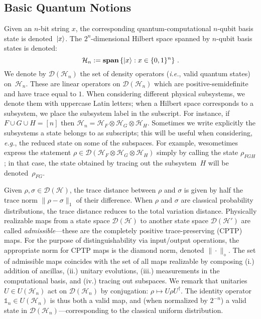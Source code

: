 \subsection{Basic Quantum Notions}
\label{sec:quantum-prelims}
Given an $n$-bit string $x$, the corresponding quantum-computational $n$-qubit basis state is denoted~${\lvert}x\rangle$. The $2^n$-dimensional Hilbert space spanned by $n$-qubit basis states is denoted:
\begin{equation}
\mathcal{H}_n := \textbf{span} \left\{ {\lvert}x\rangle : x \in \{0,1\}^{n} \right\}\,.
\end{equation}
We denote by $\mathcal{D}(\mathcal{H}_n)$ the set of density operators (\emph{i.e.}, valid quantum states) on~$\mathcal{H}_n$. These are linear operators on $\mathcal{D}(\mathcal{H}_n)$ which are positive-semidefinite and have trace equal to $1$. When considering different physical subsystems, we denote them with uppercase Latin letters; when a Hilbert space corresponds to a subsystem, we place the subsystem label in the subscript. For instance, if $F \cup G \cup H = [n]$ then $\mathcal{H}_n = \mathcal{H}_F \otimes \mathcal{H}_G \otimes \mathcal{H}_H.$ Sometimes we  write explicitly the subsystems a state belongs to as subscripts; this will be useful when considering, \emph{e.g.}, the reduced state on some of the subspaces. For example, wesometimes express the statement $\rho \in \mathcal{D}(\mathcal{H}_F \otimes \mathcal{H}_G \otimes \mathcal{H}_H)$ simply by calling the state $\rho_{FGH}$; in that case, the state obtained by tracing out the subsystem~$H$ will be denoted~$\rho_{FG}$.


Given $\rho, \sigma \in \mathcal{D}(\mathcal{H})$, the trace distance between $\rho$ and $\sigma$ is given by half the trace norm $\|\rho - \sigma\|_1$ of their difference. When $\rho$ and $\sigma$ are classical probability distributions, the trace distance reduces to the total variation distance. Physically realizable maps from a state space $\mathcal{D}(\mathcal{H})$ to another state space $\mathcal{D}(\mathcal{H}')$ are called \emph{admissible}---these are the completely positive trace-preserving (CPTP) maps. For the purpose of distinguishability via input/output operations, the appropriate norm for CPTP maps is the diamond norm, denoted $\|\cdot\|_\diamond$. The set of admissible maps coincides with the set of all maps realizable by composing (i.) addition of ancillas, (ii.) unitary evolutions, (iii.) measurements in the computational basis, and (iv.) tracing out subspaces. We remark that unitaries $U \in U(\mathcal{H}_n)$ act on $\mathcal{D}(\mathcal{H}_n)$ by conjugation: $\rho \mapsto U \rho U^\dagger$. The identity operator~$\mathds{1}_n \in U(\mathcal{H}_n)$ is thus both a valid map, and (when normalized by $2^{-n}$) a valid state in $\mathcal{D}(\mathcal{H}_n)$---corresponding to the classical uniform distribution.


